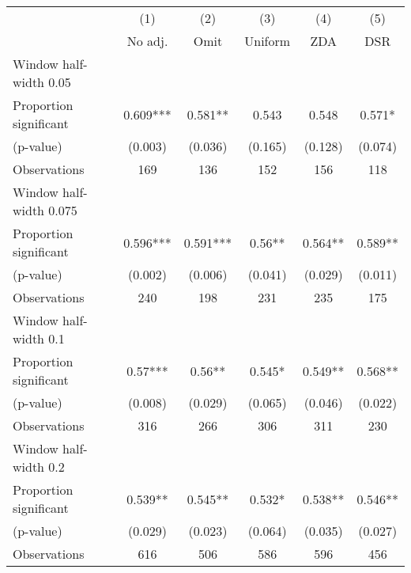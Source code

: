 
\def\sym#1{\ifmmode^{#1}\else\(^{#1}\)\fi}
\begin{tabular}{l*{5}{c}}
\hline\hline
& \multicolumn{1}{c}{(1)} &  \multicolumn{1}{c}{(2)} &  \multicolumn{1}{c}{(3)} &  \multicolumn{1}{c}{(4)} &  \multicolumn{1}{c}{(5)}\\
& \multicolumn{1}{c}{No adj.} &  \multicolumn{1}{c}{Omit} &  \multicolumn{1}{c}{Uniform} &  \multicolumn{1}{c}{ZDA} &  \multicolumn{1}{c}{DSR}\\

\hline
\hline
Window half-width 0.05\\

Proportion significant& 0.609*** &  0.581** &  0.543 &  0.548 &  0.571*\\

(p-value) & (0.003) &  (0.036) &  (0.165) &  (0.128) &  (0.074)\\

Observations& 169 &  136 &  152 &  156 &  118\\

\hline
Window half-width 0.075\\

Proportion significant& 0.596*** &  0.591*** &  0.56** &  0.564** &  0.589**\\

(p-value) & (0.002) &  (0.006) &  (0.041) &  (0.029) &  (0.011)\\

Observations& 240 &  198 &  231 &  235 &  175\\

\hline
Window half-width 0.1\\

Proportion significant& 0.57*** &  0.56** &  0.545* &  0.549** &  0.568**\\

(p-value) & (0.008) &  (0.029) &  (0.065) &  (0.046) &  (0.022)\\

Observations& 316 &  266 &  306 &  311 &  230\\

\hline
Window half-width 0.2\\

Proportion significant& 0.539** &  0.545** &  0.532* &  0.538** &  0.546**\\

(p-value) & (0.029) &  (0.023) &  (0.064) &  (0.035) &  (0.027)\\

Observations& 616 &  506 &  586 &  596 &  456\\


\end{tabular}
